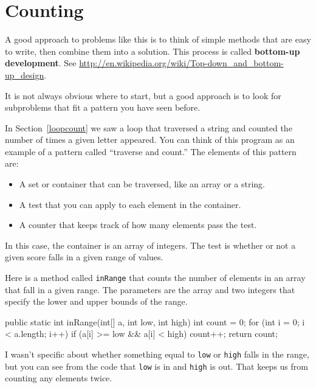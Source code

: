 \section{Counting}

A good approach to problems like this is to think of simple methods
that are easy to write, then combine them into a solution.
This process is called {\bf bottom-up development}.
See \url{http://en.wikipedia.org/wiki/Top-down_and_bottom-up_design}.

It is not always obvious where to start,
but a good approach is to look for subproblems that fit a pattern you
have seen before.

In Section~\ref{loopcount} we saw a loop that traversed a
string and counted the number of times a given letter appeared.  You
can think of this program as an example of a pattern called ``traverse
and count.''  The elements of this pattern are:

\begin{itemize}

\item A set or container that can be traversed, like an array
or a string.

\item A test that you can apply to each element in the container.

\item A counter that keeps track of how many elements pass
the test.

\end{itemize}

In this case, the container is an array of integers.  The
test is whether or not a given score falls in a given range of
values.

Here is a method called {\tt inRange} that counts the number of
elements in an array that fall in a given range.  The parameters are
the array and two integers that specify the lower and upper bounds of
the range.

\begin{code}
public static int inRange(int[] a, int low, int high) {
    int count = 0;
    for (int i = 0; i < a.length; i++) {
        if (a[i] >= low && a[i] < high) count++;
    }
    return count;
}
\end{code}
%
I wasn't specific about whether something equal
to {\tt low} or {\tt high} falls in the range, but you can
see from the code that {\tt low} is in and {\tt high} is out.
That keeps us from counting any elements twice.

